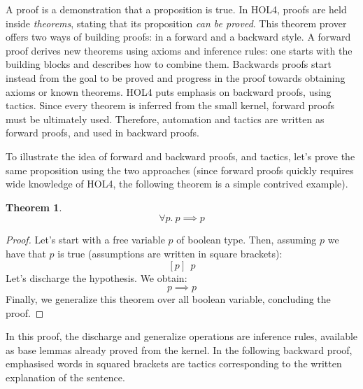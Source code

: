 \documentclass{kththesis}
\newtheorem{theorem}{Theorem}[section]
\begin{document}

A proof is a demonstration that a proposition is true. In HOL4, proofs are held inside \textit{theorems}, stating that its proposition \textit{can be proved}. This theorem prover offers two ways of building proofs: in a forward and a backward style. A forward proof derives new theorems using axioms and inference rules: one starts with the building blocks and describes how to combine them. Backwards proofs start instead from the goal to be proved and progress in the proof towards obtaining axioms or known theorems. HOL4 puts emphasis on backward proofs, using tactics. Since every theorem is inferred from the small kernel, forward proofs must be ultimately used. Therefore, automation and tactics are written as forward proofs, and used in backward proofs.

To illustrate the idea of forward and backward proofs, and tactics, let's prove the same proposition using the two approaches (since forward proofs quickly requires wide knowledge of HOL4, the following theorem is a simple contrived example).

\begin{theorem}
\begin{equation}
    \forall p.~p \implies p
    \label{hol4-simple-eq-for-proof}
\end{equation}
\end{theorem}

{
\renewcommand*{\proofname}{Forward proof}
\begin{proof}
Let's start with a free variable $p$ of boolean type. Then, assuming $p$ we have that $p$ is true (assumptions are written in square brackets):
$$[p]~~p$$
Let's discharge the hypothesis. We obtain:
$$p \implies p$$
Finally, we generalize this theorem over all boolean variable, concluding the proof.
\end{proof}
}

In this proof, the discharge and generalize operations are inference rules, available as base lemmas already proved from the kernel. In the following backward proof, emphasised words in squared brackets are tactics corresponding to the written explanation of the sentence.
\end{document}
